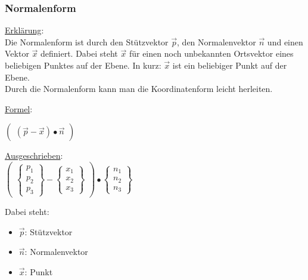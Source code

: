 
\subsubsection{Normalenform}
\underline{Erklärung}: \\
Die Normalenform ist durch den Stützvektor $\vec{p}$, 
den Normalenvektor $\vec{n}$ und einen Vektor $\vec{x}$ definiert.
Dabei steht $\vec{x}$ für einen noch unbekannten Ortsvektor eines beliebigen Punktes auf der Ebene. 
In kurz: $\vec{x}$ ist ein beliebiger Punkt auf der Ebene. \\
Durch die Normalenform kann man die Koordinatenform leicht herleiten.
\par
\underline{Formel}: 
\par
$
\begin{pmatrix}
    (\vec{p} - \vec{x}) \bullet \vec{n}
\end{pmatrix}
$ 
\par
\underline{Ausgeschrieben}: \\
$
\begin{pmatrix}
    \begin{Bmatrix}
        p_1 \\ p_2 \\ p_3
    \end{Bmatrix} 
    - 
    \begin{Bmatrix}
        x_1 \\ x_2 \\ x_3
    \end{Bmatrix}
\end{pmatrix}
\bullet 
\begin{Bmatrix}
    n_1 \\ n_2 \\ n_3
\end{Bmatrix}
$
\par
Dabei steht: 
\begin{itemize}
    \item $\vec{p}$: Stützvektor
    \item $\vec{n}$: Normalenvektor
    \item $\vec{x}$: Punkt
\end{itemize}

